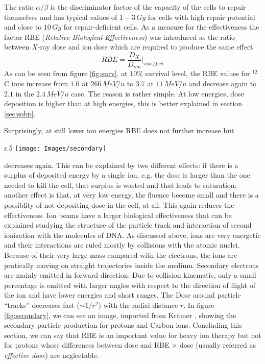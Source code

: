 \documentclass[12pt, a4paper, twoside]{book}
\begin{document}
The ratio $\alpha/\beta$ is the discriminator factor of the capacity of the cells to repair themselves and has typical values of $1-3\, Gy$ for cells with high repair potential and close to $10\, Gy$ for repair-deficient cells.
As a measure for the effectiveness the factor RBE (\emph{Relative Biological Effectiveness}) was introduced as the ratio between $X$-ray dose and ion dose which are required to produce the same effect
\[
RBE = \frac{D_X}{D_{ion}}\Bigg|_{isoeffect}
\]
As can be seen from figure \ref{fig:surv}, at $10\%$ survival level, the RBE values for $^{12}$C ions increase from $1.6$ at $266\,MeV/u$ to $3.7$ at $11\,MeV/u$ and decrease again to $2.1$ in the $2.4\,MeV/u$ case. The reason is rather simple. At low energies, dose deposition is higher than at high energies, this is better explained in section \ref{sec:sobp}.

Surprisingly, at still lower ion energies RBE does not further increase but 
\begin{wrapfigure}{r}{.5\textwidth}
\centering
{\texttt{[image: Images/secondary]}}
\caption{Monte-Carlo simulations showing individual tracks of $\delta$-electrons produced by energetic protons and $^{12}C$ ions penetrating tissue. From Kr\"amer \cite{Kram:track}}
\label{fig:secondary}
\end{wrapfigure}
\noindent decreases again. This can be explained by two different effects: if there is a surplus of deposited energy by a single ion, e.g. the dose is larger than the one needed to kill the cell, that surplus is wasted and that leads to saturation; another effect is that, at very low energy, the fluence become small and there is a possiblity of not depositing dose in the cell, at all. This again reduces the effectiveness.
Ion beams have a larger biological effectiveness that can be explained studying the structure of the particle track and interaction of second ionization with the molecules of DNA. 
As discussed above, ions are very energetic and their interactions are ruled mostly by collisions with the atomic nuclei. Because of their very large mass compared with the electrons, the ions are pratically moving on straight trajectories inside the medium.
Secondary electrons are mainly emitted in forward direction.
Due to collision kinematic, only a small percentage is emitted with larger angles with respect to the direction of flight of the ion and have lower energies and short ranges. The Dose around particle ``tracks'' decreases fast ($\sim1/r^2$) with the radial distance $r$. In figure \ref{fig:secondary}, we can see an image, imported  from Kr\"amer \cite{Kram:track}, showing the secondary particle production for protons and Carbon ions.
Concluding this section, we can say that RBE is an important value for heavy ion therapy but not for protons whose differences between dose and RBE $\times$ dose (usually referred as \emph{effective dose}) are neglectable.
\end{document}

